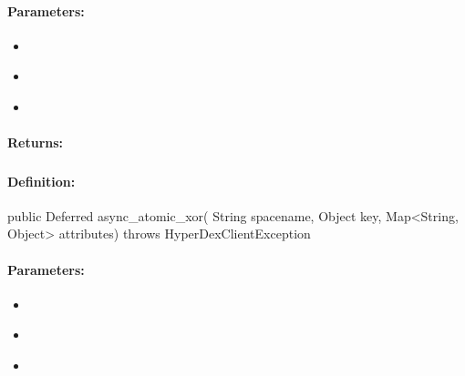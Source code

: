 \paragraph{Parameters:}
\begin{itemize}[noitemsep]
\item {}\\

\item {}\\

\item {}\\

\end{itemize}

\paragraph{Returns:}


\pagebreak
\subsubsection{}
\label{api:java:async_atomic_xor}


\paragraph{Definition:}
\begin{javacode}
public Deferred async_atomic_xor(
        String spacename,
        Object key,
        Map<String, Object> attributes) throws HyperDexClientException
\end{javacode}

\paragraph{Parameters:}
\begin{itemize}[noitemsep]
\item {}\\

\item {}\\

\item {}\\

\end{itemize}

